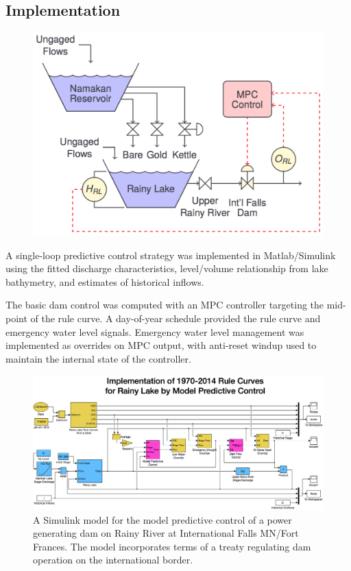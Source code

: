 \documentclass[preprint,times]{elsarticle}
\begin{document}
\subsection{Implementation}

\begin{figure}
\includegraphics[width=\linewidth]{RLMPC}
\caption{}\label{figure:9}
\end{figure}

A single-loop predictive control strategy was implemented in Matlab/Simulink using the fitted discharge characteristics, level/volume relationship from lake bathymetry, and estimates of historical inflows. 

The basic dam control was computed with an MPC controller targeting the mid-point of the rule curve. A day-of-year schedule provided the rule curve and emergency water level signals. Emergency water level management was implemented as overrides on MPC output, with anti-reset windup used to maintain the internal state of the controller.

\begin{figure}
\includegraphics[width=\linewidth]{RLSim_Model}
\caption{A Simulink model for the model predictive control of a power generating dam on Rainy River at International Falls MN/Fort Frances. The model incorporates terms of a treaty regulating dam operation on the international border.}\label{figure:10}
\end{figure}
\end{document}
